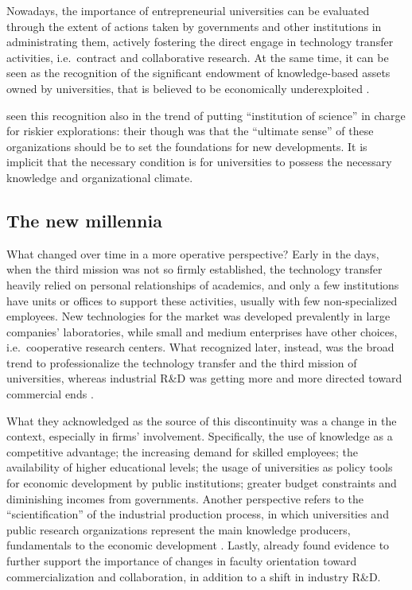Nowadays, the importance of entrepreneurial universities can be evaluated through the extent of actions taken by governments and other institutions in administrating them, actively fostering the direct engage in technology transfer activities, i.e.\ contract and collaborative research. At the same time, it can be seen as the recognition of the significant endowment of knowledge-based assets owned by universities, that is believed to be economically underexploited \citep{Tijssen2006}. 

\citet{Balconi2006} seen this recognition also in the trend of putting \enquote{institution of science} in charge for riskier explorations: their though was that the \enquote{ultimate sense} of these organizations should be to set the foundations for new developments. It is implicit that the necessary condition is for universities to possess the necessary knowledge and organizational climate.

\subsection{The new millennia}

What changed over time in a more operative perspective? Early in the days, when the third mission was not so firmly established, the technology transfer heavily relied on personal relationships of academics, and only a few institutions have units or offices to support these activities, usually with few non-specialized employees. New technologies for the market was developed prevalently in large companies' laboratories, while small and medium enterprises have other choices, i.e.\ cooperative research centers. What \citet{Geuna2009} recognized later, instead, was the broad trend to professionalize the technology transfer and the third mission of universities, whereas industrial R\&D was getting more and more directed toward commercial ends \citep{Fritsch2007}.

What they acknowledged as the source of this discontinuity was a change in the context, especially in firms' involvement. Specifically, the use of knowledge as a competitive advantage; the increasing demand for skilled employees; the availability of higher educational levels; the usage of universities as policy tools for economic development by public institutions; greater budget constraints and diminishing incomes from governments. Another perspective refers to the \enquote{scientification} of the industrial production process, in which universities and public research organizations represent the main knowledge producers, fundamentals to the economic development \citep{Balderi2007}. Lastly, already \citet{Thursby2002} found evidence to further support the importance of changes in faculty orientation toward commercialization and collaboration, in addition to a shift in industry R\&D.

